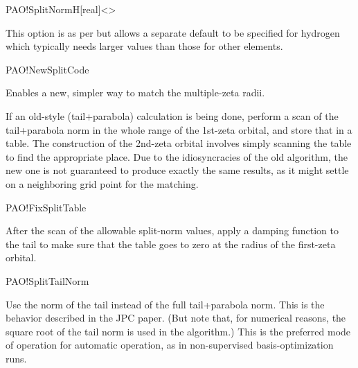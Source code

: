 \begin{fdfentry}{PAO!SplitNormH}[real]<>

  This option is as per  but allows a separate
  default to be specified for hydrogen which typically needs larger
  values than those for other elements.
  
\end{fdfentry}

\begin{fdflogicalF}{PAO!NewSplitCode}

  Enables a new, simpler way to match the multiple-zeta radii.

  If an old-style (tail+parabola) calculation is being done, perform a
  scan of the tail+parabola norm in the whole range of the 1st-zeta
  orbital, and store that in a table. The construction of the 2nd-zeta
  orbital involves simply scanning the table to find the appropriate
  place. Due to the idiosyncracies of the old algorithm, the new one
  is not guaranteed to produce exactly the same results, as it might
  settle on a neighboring grid point for the matching.
  
\end{fdflogicalF}

\begin{fdflogicalF}{PAO!FixSplitTable}

  After the scan of the allowable split-norm values, apply a damping
  function to the tail to make sure that the table goes to zero at the
  radius of the first-zeta orbital.
  
\end{fdflogicalF}

\begin{fdflogicalF}{PAO!SplitTailNorm}

  Use the norm of the tail instead of the full tail+parabola
  norm. This is the behavior described in the JPC paper. (But note
  that, for numerical reasons, the square root of the tail norm is
  used in the algorithm.) This is the preferred mode of operation for
  automatic operation, as in non-supervised basis-optimization runs.
  
\end{fdflogicalF}



